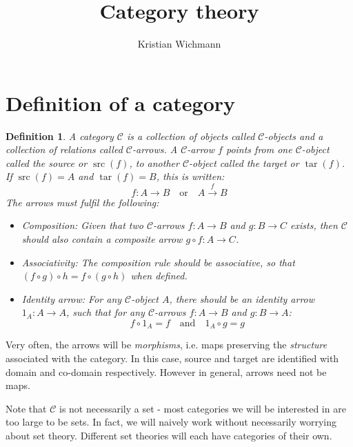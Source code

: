 \documentclass[12pt, a4paper]{article}
\title{Category theory}
\author{Kristian Wichmann}
\newtheorem{definition}{Definition}[section]
\numberwithin{equation}{section}
\DeclareMathOperator{\src}{src}
\DeclareMathOperator{\tar}{tar}
\begin{document}
\maketitle

\section{Definition of a category}
\begin{definition}
A category $\mathcal{C}$ is a collection of objects called $\mathcal{C}$-objects and a collection of relations called $\mathcal{C}$-arrows. A $\mathcal{C}$-arrow $f$ points from one $\mathcal{C}$-object called the source or $\src(f)$, to another $\mathcal{C}$-object called the target or $\tar(f)$. If $\src(f)=A$ and $\tar(f)=B$, this is written:
\begin{equation}
f: A\rightarrow B\quad\textrm{or}\quad A\xrightarrow{f}B
\end{equation}
The arrows must fulfil the following:
\begin{itemize}
\item Composition: Given that two $\mathcal{C}$-arrows $f: A\rightarrow B$ and $g:B\rightarrow C$ exists, then $\mathcal{C}$ should also contain a composite arrow $g\circ f: A\rightarrow C$.
\item Associativity: The composition rule should be associative, so that $(f\circ g)\circ h=f\circ(g\circ h)$ when defined.
\item Identity arrow: For any $\mathcal{C}$-object $A$, there should be an identity arrow $1_A: A\rightarrow A$, such that for any $\mathcal{C}$-arrows $f: A\rightarrow B$ and $g: B\rightarrow A$:
\begin{equation}
f\circ 1_A=f\quad\textrm{and}\quad 1_A\circ g=g
\end{equation}
\end{itemize}
\end{definition}

Very often, the arrows will be \textit{morphisms}, i.e. maps preserving the \textit{structure} associated with the category. In this case, source and target are identified with domain and co-domain respectively. However in general, arrows need not be maps.

Note that $\mathcal{C}$ is not necessarily a set - most categories we will be interested in are too large to be sets. In fact, we will naively work without necessarily worrying about set theory. Different set theories will each have categories of their own.
\end{document}
